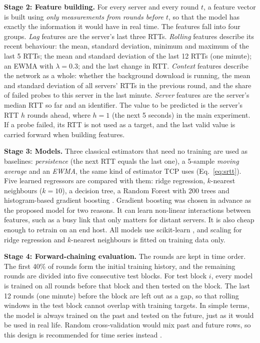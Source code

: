\documentclass[pdflatex,sn-mathphys-num]{sn-jnl}
\begin{document}
\textbf{Stage 2: Feature building.} For every server and every round $t$, a feature vector is built using \emph{only measurements from rounds before $t$}, so that the model has exactly the information it would have in real time. The features fall into four groups. \emph{Lag} features are the server's last three RTTs. \emph{Rolling} features describe its recent behaviour: the mean, standard deviation, minimum and maximum of the last 5 RTTs; the mean and standard deviation of the last 12 RTTs (one minute); an EWMA with $\lambda = 0.3$; and the last change in RTT. \emph{Context} features describe the network as a whole: whether the background download is running, the mean and standard deviation of all servers' RTTs in the previous round, and the share of failed probes to this server in the last minute. \emph{Server} features are the server's median RTT so far and an identifier. The value to be predicted is the server's RTT $h$ rounds ahead, where $h = 1$ (the next 5 seconds) in the main experiment. If a probe failed, its RTT is not used as a target, and the last valid value is carried forward when building features.

\textbf{Stage 3: Models.} Three classical estimators that need no training are used as baselines: \emph{persistence} (the next RTT equals the last one), a 5-sample \emph{moving average} and an \emph{EWMA}, the same kind of estimator TCP uses (Eq.~\ref{eq:srtt}). Five learned regressors are compared with them: ridge regression, $k$-nearest neighbours ($k = 10$), a decision tree, a Random Forest with 200 trees \cite{breiman2001rf} and histogram-based gradient boosting \cite{friedman2001gbm,ke2017lightgbm}. Gradient boosting was chosen in advance as the proposed model for two reasons. It can learn non-linear interactions between features, such as a busy link that only matters for distant servers. It is also cheap enough to retrain on an end host. All models use scikit-learn \cite{pedregosa2011sklearn}, and scaling for ridge regression and $k$-nearest neighbours is fitted on training data only.

\textbf{Stage 4: Forward-chaining evaluation.} The rounds are kept in time order. The first 40\% of rounds form the initial training history, and the remaining rounds are divided into five consecutive test blocks. For test block $i$, every model is trained on all rounds before that block and then tested on the block. The last 12 rounds (one minute) before the block are left out as a gap, so that rolling windows in the test block cannot overlap with training targets. In simple terms, the model is always trained on the past and tested on the future, just as it would be used in real life. Random cross-validation would mix past and future rows, so this design is recommended for time series instead \cite{bergmeir2012cv,cerqueira2020eval}.
\end{document}
